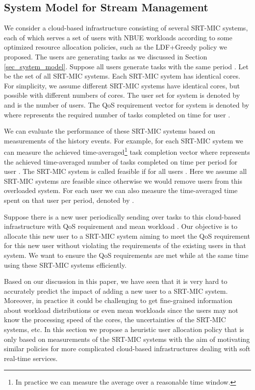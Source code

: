 \documentclass[prodmode,acmtompecs]{acmsmall}
\begin{document}
\subsection{System Model for Stream Management}
We consider a cloud-based infrastructure consisting of several SRT-MIC systems, each of which serves a set of users with NBUE workloads according to some optimized resource allocation policies, such as the LDF+Greedy policy we proposed. The users are generating tasks as we discussed in Section \ref{sec_system_model}. 
Suppose all users generate tasks with the same period . Let  be the set of all SRT-MIC systems. Each SRT-MIC system  has  identical cores. For simplicity, we assume different SRT-MIC systems have identical cores, but possible with different numbers of cores. The user set for system  is denoted by  and  is the number of users. The QoS requirement vector for system  is denoted by  where  represents the required number of tasks completed on time for user . 

We can evaluate the performance of these SRT-MIC systems based on measurements of the history events. For example, for each SRT-MIC system  we can measure the achieved time-averaged\footnote{In practice we can measure the average over a reasonable time window. } task completion vector  where  represents the achieved time-averaged number of tasks completed on time per period for user . The SRT-MIC system  is called feasible if  for all users . Here we assume all SRT-MIC systems are feasible since otherwise we would remove users from this overloaded system. 
For each user  we can also measure the time-averaged time spent on that user per period, denoted by . 

Suppose there is a new user  periodically sending over tasks to this cloud-based infrastructure with QoS requirement  and mean workload . Our objective is to allocate this new user to a SRT-MIC system aiming to meet the QoS requirement for this new user without violating the requirements of the existing users in that system. We want to ensure the QoS requirements are met while at the same time using these SRT-MIC systems efficiently. 

Based on our discussion in this paper, we have seen that it is very hard to accurately predict the impact of adding a new user to a SRT-MIC system. 
Moreover, in practice it could be challenging to get fine-grained information about workload distributions or even mean workloads since the users may not know the processing speed of the cores, the uncertainties of the SRT-MIC systems, etc. 
In this section we propose a heuristic user allocation policy that is only based on measurements of the SRT-MIC systems with the aim of motivating similar policies for more complicated cloud-based infrastructures dealing with soft real-time services. 
\end{document}
